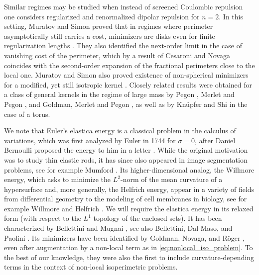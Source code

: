 \documentclass[11pt]{article}
\numberwithin{statement}{section}
\numberwithin{equation}{section}
\theoremstyle{remark}
\begin{document}
Similar regimes may be studied when instead of screened Coulombic
repulsion one considers regularized and renormalized dipolar repulsion
for $n=2$.  In this setting, Muratov and Simon proved that in regimes
where perimeter asymptotically still carries a cost, minimizers are
disks even for finite regularization lengths
\cite{muratov2018nonlocal}.  They also identified the next-order limit
in the case of vanishing cost of the perimeter, which by a result of
Cesaroni and Novaga \cite{cesaroni2022second} coincides with the
second-order expansion of the fractional perimeters close to the local
one.  Muratov and Simon also proved existence of non-spherical
minimizers for a modified, yet still isotropic kernel
\cite{muratov2018nonlocal}.  Closely related results were obtained for
a class of general kernels in the regime of large mass by Pegon
\cite{pegon2021large}, Merlet and Pegon \cite{merlet2022large}, and
Goldman, Merlet and Pegon \cite{goldman2022uniform}, as well as by
Kn{\"u}pfer and Shi \cite{knuepfer2022second} in the case of a torus.

We note that Euler's elastica energy is a classical problem in the
calculus of variations, which was first analyzed by Euler in 1744 for
$\sigma=0$, after Daniel Bernoulli proposed the energy to him in a
letter \cite{euler1774methodus}.  While the original motivation was to
study thin elastic rods, it has since also appeared in image
segmentation problems, see for example Mumford
\cite{mumford1994elastica}.  Its higher-dimensional analog, the
Willmore energy, which asks to minimize the $L^2$-norm of the mean
curvature of a hypersurface and, more generally, the Helfrich energy,
appear in a variety of fields from differential geometry to the
modeling of cell membranes in biology, see for example Willmore
\cite{willmore1992survey} and Helfrich \cite{helfrich1973elastic}.  We
will require the elastica energy in its relaxed form (with respect to
the $L^1$ topology of the enclosed sets).  It has been characterized
by Bellettini and Mugnai
\cite{belletini2004characterization,bellettini2007varifolds}, see also
Bellettini, Dal Maso, and Paolini \cite{bellettini1993semicontinuity}.
Its minimizers have been identified by Goldman, Novaga, and R{\"o}ger
\cite{goldman2020quantitative}, even after augmentation by a non-local
term as in \eqref{eq:nonlocal_iso_problem}.  To the best of our
knowledge, they were also the first to include curvature-depending
terms in the context of non-local isoperimetric problems.
\end{document}
